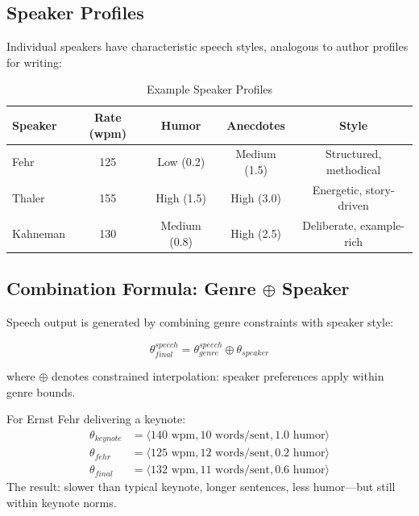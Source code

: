 \subsection{Speaker Profiles}
\label{sec:sw-speaker-profiles}

Individual speakers have characteristic speech styles, analogous to author profiles for writing:

\begin{table}[h]
\centering
\caption{Example Speaker Profiles}
\label{tab:sw-speaker-profiles}
\begin{tabular}{lcccc}
\toprule
\textbf{Speaker} & \textbf{Rate (wpm)} & \textbf{Humor} & \textbf{Anecdotes} & \textbf{Style} \\
\midrule
Fehr & 125 & Low (0.2) & Medium (1.5) & Structured, methodical \\
Thaler & 155 & High (1.5) & High (3.0) & Energetic, story-driven \\
Kahneman & 130 & Medium (0.8) & High (2.5) & Deliberate, example-rich \\
\bottomrule
\end{tabular}
\end{table}

\subsection{Combination Formula: Genre $\oplus$ Speaker}
\label{sec:sw-speech-combination}

Speech output is generated by combining genre constraints with speaker style:

\begin{equation}
\theta_{final}^{speech} = \theta_{genre}^{speech} \oplus \theta_{speaker}
\label{eq:sw-speech-combination}
\end{equation}

where $\oplus$ denotes constrained interpolation: speaker preferences apply within genre bounds.

\begin{example}
For Ernst Fehr delivering a keynote:
\begin{align*}
\theta_{keynote} &= \langle 140 \text{ wpm}, 10 \text{ words/sent}, 1.0 \text{ humor} \rangle \\
\theta_{fehr} &= \langle 125 \text{ wpm}, 12 \text{ words/sent}, 0.2 \text{ humor} \rangle \\
\theta_{final} &= \langle 132 \text{ wpm}, 11 \text{ words/sent}, 0.6 \text{ humor} \rangle
\end{align*}
The result: slower than typical keynote, longer sentences, less humor---but still within keynote norms.
\end{example}

